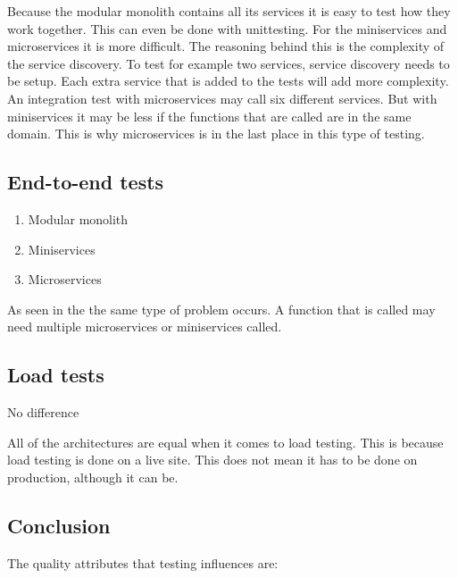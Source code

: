 Because the modular monolith contains all its services it is easy to test how they work together. This can even be done with unittesting. For the miniservices and microservices it is more difficult. The reasoning behind this is the complexity of the service discovery. To test for example two services, service discovery needs to be setup. Each extra service that is added to the tests will add more complexity. An integration test with microservices may call six different services. But with miniservices it may be less if the functions that are called are in the same domain. This is why microservices is in the last place in this type of testing.

\subsection{End-to-end tests}

\begin{enumerate}
        \item Modular monolith
        \item Miniservices
        \item Microservices
\end{enumerate}

As seen in the  the same type of problem occurs. A function that is called may need multiple microservices or miniservices called.

\subsection{Load tests}

No difference

All of the architectures are equal when it comes to load testing. This is because load testing is done on a live site. This does not mean it has to be done on production, although it can be.

\subsection{Conclusion}

The quality attributes that testing influences are:

